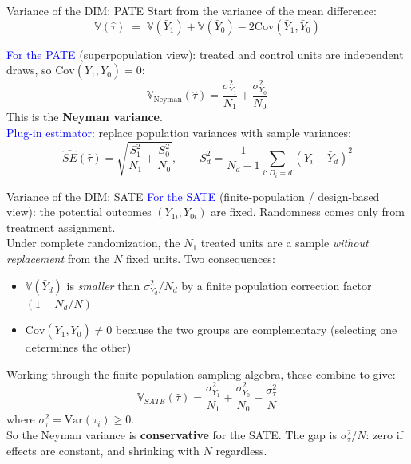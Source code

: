\documentclass[xcolor=dvipsnames]{beamer}
\newcommand\V{\mathbb{V}}
\newcommand{\Var}{\mathrm{Var}}
\newcommand{\Cov}{\mathrm{Cov}}
\begin{document}
\begin{frame}{Variance of the DIM: PATE}
\small
{} Start from the variance of the mean difference:
\[
\V(\hat\tau) \;=\; \V(\bar Y_1) + \V(\bar Y_0) - 2\Cov(\bar Y_1, \bar Y_0)
\]

 \textcolor{Blue}{For the PATE} (superpopulation view): treated and control units are independent draws, so $\Cov(\bar Y_1, \bar Y_0) = 0$:
\[
\V_{\text{Neyman}}(\hat\tau) = \frac{\sigma^2_{Y_1}}{N_1} + \frac{\sigma^2_{Y_0}}{N_0}
\]
This is the \textbf{Neyman variance}.\\

\medskip
{} \textcolor{Blue}{Plug-in estimator}: replace population variances with sample variances:
\[
\widehat{SE}(\hat\tau) = \sqrt{\frac{S_1^2}{N_1} + \frac{S_0^2}{N_0}}, \qquad S_d^2 = \frac{1}{N_d-1}\sum_{i:D_i=d}(Y_i - \bar Y_d)^2
\]
\end{frame}


\begin{frame}{Variance of the DIM: SATE}
\small
{} \textcolor{Blue}{For the SATE} (finite-population / design-based view): the potential outcomes $(Y_{1i}, Y_{0i})$ are fixed.  Randomness comes only from treatment assignment.\\

\medskip
{} Under complete randomization, the $N_1$ treated units are a sample \textit{without replacement} from the $N$ fixed units.  Two consequences:
\begin{itemize}
\footnotesize
\item $\V(\bar Y_d)$ is \textit{smaller} than $\sigma^2_{Y_d}/N_d$ by a finite population correction factor $(1 - N_d/N)$
\item $\Cov(\bar Y_1, \bar Y_0) \neq 0$ because the two groups are complementary (selecting one determines the other)
\end{itemize}

\medskip
{} Working through the finite-population sampling algebra, these combine to give:
\[
\V_{SATE}(\hat\tau) = \frac{\sigma^2_{Y_1}}{N_1} + \frac{\sigma^2_{Y_0}}{N_0} - \frac{\sigma^2_\tau}{N}
\]
where $\sigma^2_\tau = \Var(\tau_i) \geq 0$.\\

\medskip
{} So the Neyman variance is \textbf{conservative} for the SATE.  The gap is $\sigma^2_\tau/N$: zero if effects are constant, and shrinking with $N$ regardless.
\end{frame}
\end{document}

